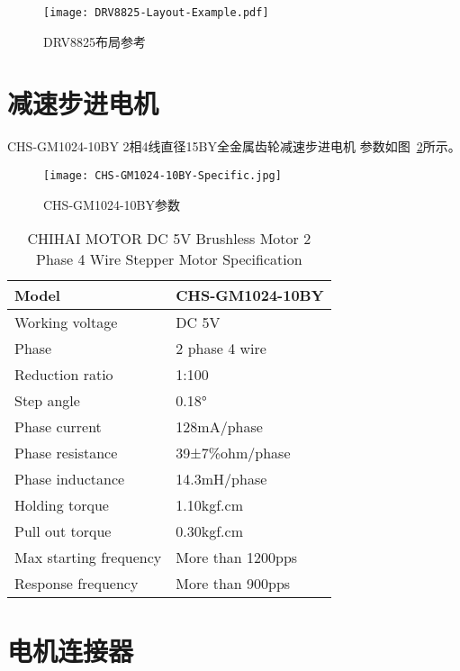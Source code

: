 \begin{figure}[htbp]
    \centering
    \texttt{[image: DRV8825-Layout-Example.pdf]}
    \caption{DRV8825布局参考}
    \label{fig:DRV8825-Layout-Example}
\end{figure}


\section{减速步进电机}

CHS-GM1024-10BY 2相4线直径15BY全金属齿轮减速步进电机 参数如图~\ref{fig:CHS-GM1024-10BY-Specific}所示。

\begin{figure}[htbp]
    \centering
    \texttt{[image: CHS-GM1024-10BY-Specific.jpg]}
    \caption{CHS-GM1024-10BY参数}
    \label{fig:CHS-GM1024-10BY-Specific}
\end{figure}

\begin{table}[htbp]
    \centering
    \begin{tabular}{ll}
    \hline
    Model                  & CHS-GM1024-10BY   \\ \hline
    Working voltage        & DC 5V             \\ \hline
    Phase                  & 2 phase 4 wire    \\ \hline
    Reduction ratio        & 1:100             \\ \hline
    Step angle             & 0.18°             \\ \hline
    Phase current          & 128mA/phase       \\ \hline
    Phase resistance       & 39±7\%ohm/phase   \\ \hline
    Phase inductance       & 14.3mH/phase      \\ \hline
    Holding torque         & 1.10kgf.cm        \\ \hline
    Pull out torque        & 0.30kgf.cm        \\ \hline
    Max starting frequency & More than 1200pps \\ \hline
    Response frequency     & More than 900pps  \\ \hline
    \end{tabular}
    \caption{CHIHAI MOTOR DC 5V Brushless Motor 2 Phase 4 Wire Stepper Motor Specification}
    \label{tab:CHS-GM1024-10BY-Specific}
\end{table}

\section{电机连接器}

